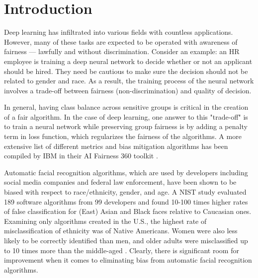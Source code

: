 \section{Introduction}
Deep learning has infiltrated into various fields with countless applications. However, many of these tasks are expected to be operated with awareness of fairness — lawfully and without discrimination. Consider an example: an HR employee is training a deep neural network to decide whether or not an applicant should be hired. They need be cautious to make sure the decision should not be related to gender and race. As a result, the training process of the neural network involves a trade-off between fairness (non-discrimination) and quality of decision.

In general, having class balance across sensitive groups is critical in the creation of a fair algorithm. In the case of deep learning, one answer to this "trade-off" is to train a neural network while preserving group fairness is by adding a penalty term in loss function, which regularizes the fairness of the algorithms. A more extensive list of different metrics and bias mitigation algorithms has been compiled by IBM in their AI Fairness 360 toolkit \cite{aif360-oct-2018}.

Automatic facial recognition algorithms, which are used by developers including social media companies and federal law enforcement, have been shown to be biased with respect to race/ethnicity, gender, and age. A NIST study evaluated 189 software algorithms from 99 developers and found 10-100 times higher rates of false classification for (East) Asian and Black faces relative to Caucasian ones. Examining only algorithms created in the U.S., the highest rate of misclassification of ethnicity was of Native Americans. Women were also less likely to be correctly identified than men, and older adults were misclassified up to 10 times more than the middle-aged  \cite{grother2019face}. Clearly, there is significant room for improvement when it comes to eliminating bias from automatic facial recognition algorithms.